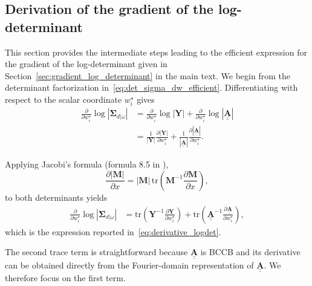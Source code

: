 \documentclass[12pt]{article}
\newcommand{\mybcirc}[1] {\underline{\underline{\bm{#1}}}}
\begin{document}
\subsection{Derivation of the gradient of the log-determinant}
\label{ap:gradient_logdet}

This section provides the intermediate steps leading to the efficient expression for the gradient of the log-determinant given in Section~\ref{sec:gradient_log_determinant} in the main text. We begin from the determinant factorization in~\eqref{eq:det_sigma_dw_efficient}. Differentiating with respect to the scalar coordinate $w_i^\star$ gives
\begin{equation}
\begin{split}
    \frac{\partial}{\partial w_i^\star}
    \log |\bm{\Sigma}_{d|\omega}|
    &=
    \frac{\partial}{\partial w_i^\star}
    \log |\bm{Y}|
    +
    \frac{\partial}{\partial w_i^\star}
    \log |\mybcirc{A}| \\
    &=
    \frac{1}{|\bm{Y}|}
    \frac{\partial |\bm{Y}|}{\partial w_i^\star}
    +
    \frac{1}{|\mybcirc{A}|}
    \frac{\partial |\mybcirc{A}|}{\partial w_i^\star}.
\end{split}
\end{equation}

Applying Jacobi's formula (formula 8.5 in \citet{Harville1997}),
\begin{equation}
    \frac{\partial |\bm{M}|}{\partial x}
    =
    |\bm{M}|
    \,
    \mathrm{tr}
    \!\left(
        \bm{M}^{-1}
        \frac{\partial \bm{M}}{\partial x}
    \right),
\end{equation}
to both determinants yields
\begin{equation}
\begin{split}
    \frac{\partial}{\partial w_i^\star}
    \log |\bm{\Sigma}_{d|\omega}|
    &=
    \mathrm{tr}
    \!\left(
        \bm{Y}^{-1}
        \frac{\partial \bm{Y}}
        {\partial w_i^\star}
    \right)
    +
    \mathrm{tr}
    \!\left(
        \mybcirc{A}^{-1}
        \frac{\partial \mybcirc{A}}
        {\partial w_i^\star}
    \right),
\end{split}
\end{equation}
which is the expression reported in~\eqref{eq:derivative_logdet}.

The second trace term is straightforward because $\mybcirc{A}$ is BCCB and its derivative can be obtained directly from the Fourier-domain representation of $\mybcirc{A}$. We therefore focus on the first term.
\end{document}

